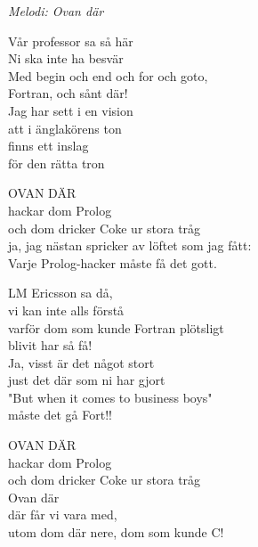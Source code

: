 {\footnotesize\textit{Melodi: Ovan där}}\par
\vspace{10pt}
Vår professor sa så här\\
Ni ska inte ha besvär\\
Med begin och end och for och goto,\\
Fortran, och sånt där!\\
Jag har sett i en vision\\
att i änglakörens ton\\
finns ett inslag\\
för den rätta tron\par
\vspace{7pt}
OVAN DÄR\\
hackar dom Prolog\\
och dom dricker Coke ur stora tråg\\
ja, jag nästan spricker av löftet som jag fått:\\
Varje Prolog-hacker måste få det gott.\par
\vspace{7pt}
LM Ericsson sa då,\\
vi kan inte alls förstå\\
varför dom som kunde Fortran plötsligt\\
blivit har så få!\\
Ja, visst är det något stort\\
just det där som ni har gjort\\
"But when it comes to business boys"\\
måste det gå Fort!!\par
\vspace{7pt}
OVAN DÄR\\
hackar dom Prolog\\
och dom dricker Coke ur stora tråg\\
Ovan där\\
där får vi vara med,\\
utom dom där nere, dom som kunde C!
